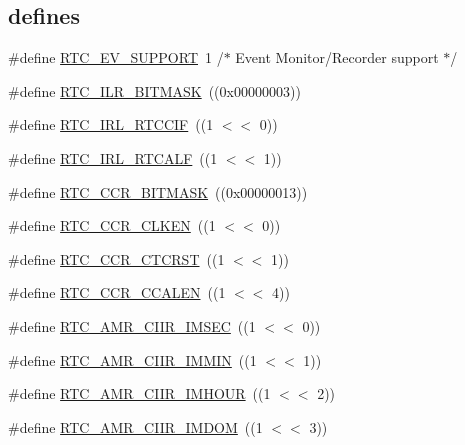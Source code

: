 \subsection*{\textquotesingle{}defines\textquotesingle{}}
\begin{DoxyCompactItemize}
\item 
\#define \hyperlink{group___r_t_c__18_x_x__43_x_x_gaeebb09cabedc374d2fd54020862be3cf}{R\+T\+C\+\_\+\+E\+V\+\_\+\+S\+U\+P\+P\+O\+RT}~1				/$\ast$ Event Monitor/Recorder support $\ast$/
\item 
\#define \hyperlink{group___r_t_c__18_x_x__43_x_x_ga9c00baff0fca4f8e747fadfe9ee12775}{R\+T\+C\+\_\+\+I\+L\+R\+\_\+\+B\+I\+T\+M\+A\+SK}~((0x00000003))
\item 
\#define \hyperlink{group___r_t_c__18_x_x__43_x_x_gaf706fff68e830a082d476467fe71f297}{R\+T\+C\+\_\+\+I\+R\+L\+\_\+\+R\+T\+C\+C\+IF}~((1 $<$$<$ 0))
\item 
\#define \hyperlink{group___r_t_c__18_x_x__43_x_x_ga237351d2c7f08b447254eff9578eb11e}{R\+T\+C\+\_\+\+I\+R\+L\+\_\+\+R\+T\+C\+A\+LF}~((1 $<$$<$ 1))
\item 
\#define \hyperlink{group___r_t_c__18_x_x__43_x_x_gadc461b6f544d66841e09499b2b9734c7}{R\+T\+C\+\_\+\+C\+C\+R\+\_\+\+B\+I\+T\+M\+A\+SK}~((0x00000013))
\item 
\#define \hyperlink{group___r_t_c__18_x_x__43_x_x_gad08af035635f5acd7931cb982f95e771}{R\+T\+C\+\_\+\+C\+C\+R\+\_\+\+C\+L\+K\+EN}~((1 $<$$<$ 0))
\item 
\#define \hyperlink{group___r_t_c__18_x_x__43_x_x_ga70900054432c82dad7d63d4598502923}{R\+T\+C\+\_\+\+C\+C\+R\+\_\+\+C\+T\+C\+R\+ST}~((1 $<$$<$ 1))
\item 
\#define \hyperlink{group___r_t_c__18_x_x__43_x_x_gaeb77b2340d896fae77ea670bb70e972e}{R\+T\+C\+\_\+\+C\+C\+R\+\_\+\+C\+C\+A\+L\+EN}~((1 $<$$<$ 4))
\item 
\#define \hyperlink{group___r_t_c__18_x_x__43_x_x_ga30c785b6017020d4c0b61b22aff30aac}{R\+T\+C\+\_\+\+A\+M\+R\+\_\+\+C\+I\+I\+R\+\_\+\+I\+M\+S\+EC}~((1 $<$$<$ 0))
\item 
\#define \hyperlink{group___r_t_c__18_x_x__43_x_x_ga3d67e7c72ec7bcd0831628841496cbc6}{R\+T\+C\+\_\+\+A\+M\+R\+\_\+\+C\+I\+I\+R\+\_\+\+I\+M\+M\+IN}~((1 $<$$<$ 1))
\item 
\#define \hyperlink{group___r_t_c__18_x_x__43_x_x_ga4e20983ef05abf10773186d3193270f9}{R\+T\+C\+\_\+\+A\+M\+R\+\_\+\+C\+I\+I\+R\+\_\+\+I\+M\+H\+O\+UR}~((1 $<$$<$ 2))
\item 
\#define \hyperlink{group___r_t_c__18_x_x__43_x_x_gacd23cffe1367b6bb612fb37ebdf2e279}{R\+T\+C\+\_\+\+A\+M\+R\+\_\+\+C\+I\+I\+R\+\_\+\+I\+M\+D\+OM}~((1 $<$$<$ 3))
$$
\end{DoxyCompactItemize}
